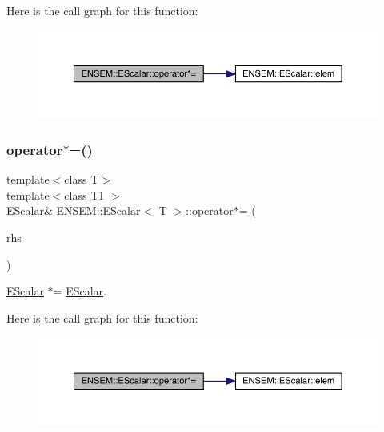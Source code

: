 Here is the call graph for this function\+:
\nopagebreak
\begin{figure}[H]
\begin{center}
\leavevmode
\includegraphics[width=350pt]{d0/d82/classENSEM_1_1EScalar_aa614bef8258a8ea3c2711c4d7d032c1a_cgraph}
\end{center}
\end{figure}
\mbox{\label{classENSEM_1_1EScalar_aa614bef8258a8ea3c2711c4d7d032c1a}} 
\subsubsection{\texorpdfstring{operator$\ast$=()}{operator*=()}\hspace{0.1cm}{\footnotesize\ttfamily [2/3]}}
{\footnotesize\ttfamily template$<$class T$>$ \\
template$<$class T1 $>$ \\
\mbox{\hyperlink{classENSEM_1_1EScalar}{E\+Scalar}}\& \mbox{\hyperlink{classENSEM_1_1EScalar}{E\+N\+S\+E\+M\+::\+E\+Scalar}}$<$ T $>$\+::operator$\ast$= (\begin{DoxyParamCaption}\item[{const \mbox{\hyperlink{classENSEM_1_1EScalar}{E\+Scalar}}$<$ T1 $>$ \&}]{rhs }\end{DoxyParamCaption})\hspace{0.3cm}{\ttfamily [inline]}}



\mbox{\hyperlink{classENSEM_1_1EScalar}{E\+Scalar}} $\ast$= \mbox{\hyperlink{classENSEM_1_1EScalar}{E\+Scalar}}. 

Here is the call graph for this function\+:
\nopagebreak
\begin{figure}[H]
\begin{center}
\leavevmode
\includegraphics[width=350pt]{d0/d82/classENSEM_1_1EScalar_aa614bef8258a8ea3c2711c4d7d032c1a_cgraph}
\end{center}
\end{figure}
\mbox{\label{classENSEM_1_1EScalar_aa614bef8258a8ea3c2711c4d7d032c1a}} 

